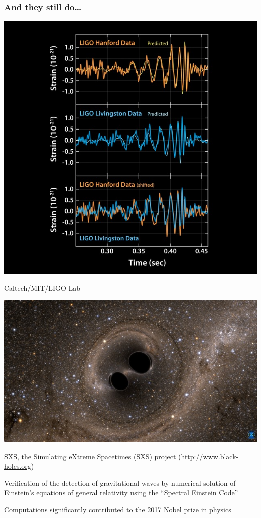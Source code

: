 \begin{frame}\frametitle{And they still do\ldots{}}

  \begin{minipage}{0.45\textwidth}
    \includegraphics[width=\textwidth]{pic/ligo20160211a.jpg}
    
    
    {\tiny Caltech/MIT/LIGO Lab }
  \end{minipage}\hfill
  \begin{minipage}{0.45\textwidth}
    \includegraphics[width=\textwidth]{pic/ligo20160211d.jpg}
    
    
    {\tiny SXS, the Simulating eXtreme Spacetimes (SXS) project (\url{http://www.black-holes.org})}
  \end{minipage}
  
  Verification of the detection of gravitational waves by numerical
  solution of Einstein's equations of general relativity using the
  ``Spectral Einstein Code''

  Computations significantly contributed to the 2017 Nobel prize in physics
\end{frame}

